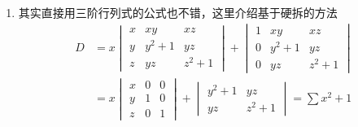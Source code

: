 \begin{enumerate}
\begin{enumerate}
            \item 其实直接用三阶行列式的公式也不错，这里介绍基于硬拆的方法
                  \begin{align*}
                      D & =x\begin{vmatrix}
                                x & xy    & xz    \\
                                y & y^2+1 & yz    \\
                                z & yz    & z^2+1
                            \end{vmatrix}+\begin{vmatrix}
                                              1 & xy    & xz    \\
                                              0 & y^2+1 & yz    \\
                                              0 & yz    & z^2+1
                                          \end{vmatrix} \\
                        & =x\begin{vmatrix}
                                x & 0 & 0 \\
                                y & 1 & 0 \\
                                z & 0 & 1
                            \end{vmatrix}+\begin{vmatrix}
                                              y^2+1 & yz    \\
                                              yz    & z^2+1
                                          \end{vmatrix}
                      =\sum x^2+1
                  \end{align*}
        \end{enumerate}


\end{enumerate}
